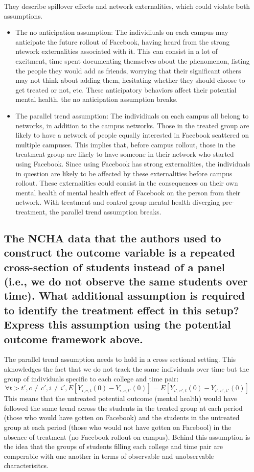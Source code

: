 \documentclass{article}
\begin{document}
They describe spillover effects and network externalities, which could violate both assumptions.
\begin{itemize}
    \item The no anticipation assumption:
    The individiuals on each campus may anticipate the future rollout of Facebook, having heard from the strong ntework externalities associated with it. This can consist in a lot of excitment, time spent documenting themselves about the phenomenon, listing the people they would add as friends, worrying that their significant others may not think about adding them, hesitating whether they should choose to get treated or not, etc. These anticipatory behaviors affect their potential mental health, the no anticipation assumption breaks.
    \item The parallel trend assumption:
    The individiuals on each campus all belong to networks, in addition to the campus networks. Those in the treated group are likely to have a network of people equally interested in Facebook scattered on multiple campuses. This implies that, before campus rollout, those in the treatment group are likely to have someone in their network who started using Facebook. Since using Facebook has strong externalities, the individuals in question are likely to be affected by these externalities before campus rollout. These externalities could consist in the consequences on their own mental health of mental health effect of Facebook on the person from their network. With treatment and control group mental health diverging pre-treatment, the parallel trend assumption breaks. 
\end{itemize}

\subsection{The NCHA data that the authors used to construct the outcome variable is a repeated cross-section of students instead of a panel (i.e., we do not observe the same students over time). What additional assumption is required to identify the treatment effect in this setup? Express this assumption using the potential outcome framework above.}

The parallel trend assumption needs to hold in  a cross sectional setting. This aknowledges the fact that we do not track the same individuals over time but the group of individuals specific to each college and time pair:
\[\forall t>t', c\neq c', i\neq i',
E[Y_{i,c,t}(0)-Y_{i,c,t'}(0)]
=E[Y_{i',c',t}(0)-Y_{i',c',t'}(0)]
\]
This means that the untreated potential outcome (mental health) would have followed the same trend across the students in the treated group at each period (those who would have gotten on Facebook) and the students in the untreated group at each period (those who would not have gotten on Facebool) in the absence of treatment (no Facebook rollout on campus). Behind this assumption is the idea that the groups of students filling each college and time pair are comperable with one another in terms of observable and unobservable characterisitcs.
\end{document}
